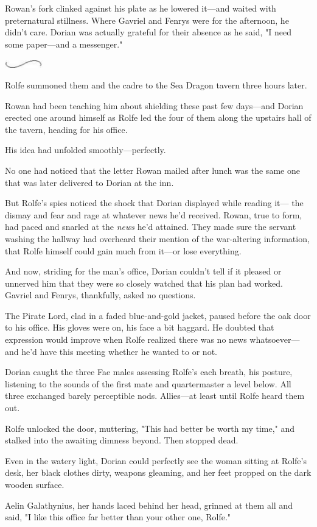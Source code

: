 Rowan's fork clinked against his plate as he lowered it---and waited with preternatural stillness.
Where Gavriel and Fenrys were for the afternoon, he didn't care.
Dorian was actually grateful for their absence as he said, "I need some paper---and a messenger."

\begin{center}
	\includegraphics[width=0.65in,height=0.13in]{images/seperator}
\end{center}

Rolfe summoned them and the cadre to the Sea Dragon tavern three hours later.

Rowan had been teaching him about shielding these past few days---and Dorian erected one around himself as Rolfe led the four of them along the upstairs hall of the tavern, heading for his office.

His idea had unfolded smoothly---perfectly.

No one had noticed that the letter Rowan mailed after lunch was the same one that was later delivered to Dorian at the inn.

But Rolfe's spies noticed the shock that Dorian displayed while reading it--- the dismay and fear and rage at whatever news he'd received.
Rowan, true to form, had paced and snarled at the \emph{news} he'd attained.
They made sure the servant washing the hallway had overheard their mention of the war-altering information, that Rolfe himself could gain much from it---or lose everything.

And now, striding for the man's office, Dorian couldn't tell if it pleased or unnerved him that they were so closely watched that his plan had worked.
Gavriel and Fenrys, thankfully, asked no questions.

The Pirate Lord, clad in a faded blue-and-gold jacket, paused before the oak door to his office.
His gloves were on, his face a bit haggard.
He doubted that expression would improve when Rolfe realized there was no news whatsoever--- and he'd have this meeting whether he wanted to or not.

Dorian caught the three Fae males assessing Rolfe's each breath, his posture, listening to the sounds of the first mate and quartermaster a level below.
All three exchanged barely perceptible nods.
Allies---at least until Rolfe heard them out.

Rolfe unlocked the door, muttering, "This had better be worth my time," and stalked into the awaiting dimness beyond.
Then stopped dead.

Even in the watery light, Dorian could perfectly see the woman sitting at Rolfe's desk, her black clothes dirty, weapons gleaming, and her feet propped on the dark wooden surface.

Aelin Galathynius, her hands laced behind her head, grinned at them all and said, "I like this office far better than your other one, Rolfe."
